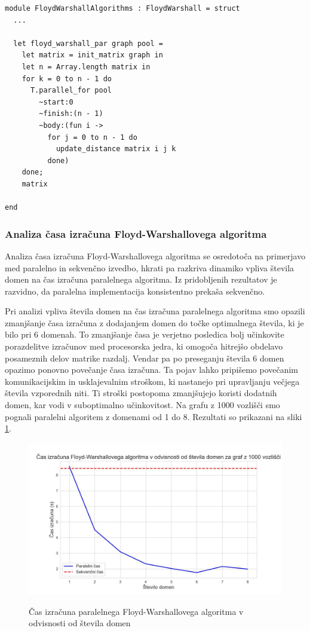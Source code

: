 \documentclass[mat1, tisk]{fmfdelo}
\begin{document}
\begin{lstlisting}[label=lst:floyd_warshall_par]
module FloydWarshallAlgorithms : FloydWarshall = struct
  ...

  let floyd_warshall_par graph pool =
    let matrix = init_matrix graph in
    let n = Array.length matrix in
    for k = 0 to n - 1 do
      T.parallel_for pool 
        ~start:0 
        ~finish:(n - 1) 
        ~body:(fun i ->
          for j = 0 to n - 1 do
            update_distance matrix i j k
          done)
    done;
    matrix

end
\end{lstlisting}

\subsubsection{Analiza časa izračuna Floyd-Warshallovega algoritma}

Analiza časa izračuna Floyd-Warshallovega algoritma se osredotoča na primerjavo med paralelno in sekvenčno izvedbo, hkrati pa razkriva
dinamiko vpliva števila domen na čas izračuna paralelnega algoritma. Iz pridobljenih rezultatov je razvidno, da paralelna implementacija
konsistentno prekaša sekvenčno.

Pri analizi vpliva števila domen na čas izračuna paralelnega algoritma smo opazili zmanjšanje časa izračuna z dodajanjem domen do točke
optimalnega števila, ki je bilo pri 6 domenah. To zmanjšanje časa je verjetno posledica bolj učinkovite porazdelitve izračunov med procesorska jedra,
ki omogoča hitrejšo obdelavo posameznih delov matrike razdalj. Vendar pa po preseganju števila 6 domen opazimo ponovno povečanje časa izračuna.
Ta pojav lahko pripišemo povečanim komunikacijskim in usklajevalnim stroškom, ki nastanejo pri upravljanju večjega števila vzporednih niti.
Ti stroški postopoma zmanjšujejo koristi dodatnih domen, kar vodi v suboptimalno učinkovitost.
Na grafu z 1000 vozlišči smo pognali paralelni algoritem z domenami od 1 do 8. Rezultati so prikazani na sliki \ref{fig:floyd_v_odvisnosti_od_stevila_domen}.


\begin{figure}[h!]
  \centering
  \caption{Čas izračuna paralelnega Floyd-Warshallovega algoritma v odvisnosti od števila domen}
  \includegraphics[width=15cm]{slike/floyd_v_odvisnosti_od_stevila_domen.jpg}
  \label{fig:floyd_v_odvisnosti_od_stevila_domen}
\end{figure}
\end{document}
